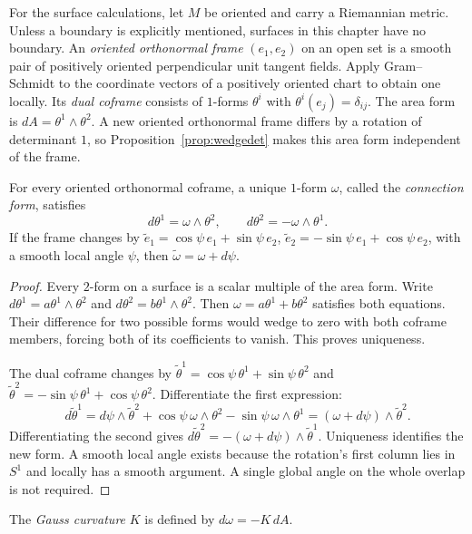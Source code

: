 For the surface calculations, let $M$ be oriented and carry a Riemannian metric. Unless a boundary is explicitly mentioned, surfaces in this chapter have no boundary. An \emph{oriented orthonormal frame} $(e_1,e_2)$ on an open set is a smooth pair of positively oriented perpendicular unit tangent fields. Apply Gram--Schmidt to the coordinate vectors of a positively oriented chart to obtain one locally. Its \emph{dual coframe} consists of $1$-forms $\theta^i$ with $\theta^i(e_j)=\delta_{ij}$. The area form is $dA=\theta^1\wedge\theta^2$. A new oriented orthonormal frame differs by a rotation of determinant $1$, so Proposition~\ref{prop:wedgedet} makes this area form independent of the frame.

\begin{proposition}\label{prop:structure}
For every oriented orthonormal coframe, a unique $1$-form $\omega$, called the \emph{connection form}, satisfies
\[
d\theta^1=\omega\wedge\theta^2,\qquad d\theta^2=-\omega\wedge\theta^1.
\]
If the frame changes by $\tilde e_1=\cos\psi\,e_1+\sin\psi\,e_2$, $\tilde e_2=-\sin\psi\,e_1+\cos\psi\,e_2$, with a smooth local angle $\psi$, then $\tilde\omega=\omega+d\psi$.
\end{proposition}

\begin{proof}
Every $2$-form on a surface is a scalar multiple of the area form. Write $d\theta^1=a\theta^1\wedge\theta^2$ and $d\theta^2=b\theta^1\wedge\theta^2$. Then $\omega=a\theta^1+b\theta^2$ satisfies both equations. Their difference for two possible forms would wedge to zero with both coframe members, forcing both of its coefficients to vanish. This proves uniqueness.

The dual coframe changes by $\tilde\theta^1=\cos\psi\,\theta^1+\sin\psi\,\theta^2$ and $\tilde\theta^2=-\sin\psi\,\theta^1+\cos\psi\,\theta^2$. Differentiate the first expression:
\[
d\tilde\theta^1=d\psi\wedge\tilde\theta^2
+\cos\psi\,\omega\wedge\theta^2-\sin\psi\,\omega\wedge\theta^1
=(\omega+d\psi)\wedge\tilde\theta^2.
\]
Differentiating the second gives $d\tilde\theta^2=-(\omega+d\psi)\wedge\tilde\theta^1$. Uniqueness identifies the new form. A smooth local angle exists because the rotation's first column lies in $S^1$ and locally has a smooth argument. A single global angle on the whole overlap is not required.
\end{proof}

\begin{definition}
The \emph{Gauss curvature} $K$ is defined by $d\omega=-K\,dA$.
\end{definition}

